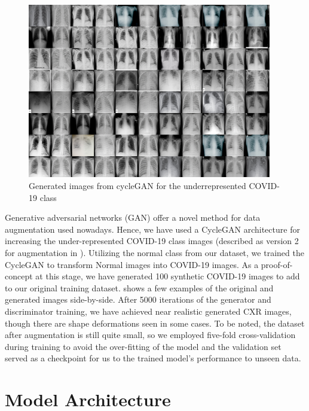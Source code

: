 \begin{figure}
\centering [h!]
\includegraphics[width=0.95\textwidth]{images/GENARATED IMAGES.png}
   \caption{ Generated images from cycleGAN for the underrepresented COVID-19 class}
\label{fig:gan}
\end{figure}


Generative adversarial networks (GAN) offer a novel method for data augmentation used nowadays. Hence, we have used a CycleGAN \cite{zhu2017unpaired} architecture for increasing the under-represented COVID-19 class images (described as version 2 for augmentation in ).  Utilizing the normal class from our dataset, we trained the CycleGAN to transform Normal images into COVID-19 images. As a proof-of-concept at this stage, we have generated 100 synthetic COVID-19 images to add to our original training dataset.  shows a few examples of the original and generated images side-by-side. After 5000 iterations of the generator and discriminator training, we have achieved near realistic generated CXR images, though there are shape deformations seen in some cases. To be noted, the dataset after augmentation is still quite small, so we employed five-fold cross-validation during training to avoid the over-fitting
of the model and the validation set served as a checkpoint for us to the trained model's performance to unseen data.






\section{Model Architecture}
\label{sec:Methods}
